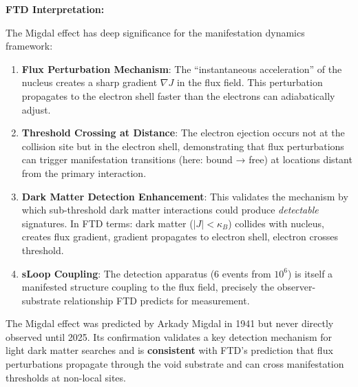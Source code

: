 \documentclass[
  11pt,
  letterpaper,
  twoside,
  openright]{book}
\begin{document}
\textbf{FTD Interpretation:}

The Migdal effect has deep significance for the manifestation dynamics
framework:

\begin{enumerate}
\def\labelenumi{\arabic{enumi}.}
\item
  \textbf{Flux Perturbation Mechanism}: The ``instantaneous
  acceleration'' of the nucleus creates a sharp gradient \(\nabla J\) in
  the flux field. This perturbation propagates to the electron shell
  faster than the electrons can adiabatically adjust.
\item
  \textbf{Threshold Crossing at Distance}: The electron ejection occurs
  not at the collision site but in the electron shell, demonstrating
  that flux perturbations can trigger manifestation transitions (here:
  bound → free) at locations distant from the primary interaction.
\item
  \textbf{Dark Matter Detection Enhancement}: This validates the
  mechanism by which sub-threshold dark matter interactions could
  produce \emph{detectable} signatures. In FTD terms: dark matter
  (\(|J| < \kappa_B\)) collides with nucleus, creates flux gradient,
  gradient propagates to electron shell, electron crosses threshold.
\item
  \textbf{sLoop Coupling}: The detection apparatus (6 events from
  \(10^6\)) is itself a manifested structure coupling to the flux field,
  precisely the observer-substrate relationship FTD predicts for
  measurement.
\end{enumerate}

\begin{tcolorbox}[enhanced jigsaw, coltitle=black, colbacktitle=quarto-callout-note-color!10!white, toprule=.15mm, colframe=quarto-callout-note-color-frame, arc=.35mm, opacityback=0, bottomtitle=1mm, toptitle=1mm, breakable, colback=white, titlerule=0mm, opacitybacktitle=0.6, title=\textcolor{quarto-callout-note-color}{\faInfo}\hspace{0.5em}{Epistemic Note}, rightrule=.15mm, bottomrule=.15mm, leftrule=.75mm, left=2mm]

The Migdal effect was predicted by Arkady Migdal in 1941 but never
directly observed until 2025. Its confirmation validates a key detection
mechanism for light dark matter searches and is \textbf{consistent} with
FTD's prediction that flux perturbations propagate through the void
substrate and can cross manifestation thresholds at non-local sites.

\end{tcolorbox}
\end{document}
